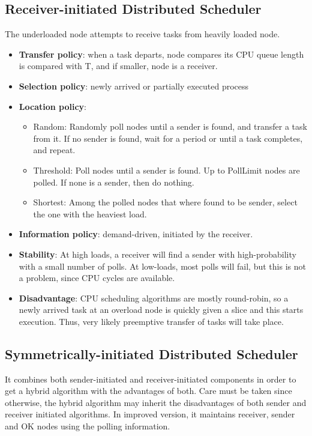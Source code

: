 \documentclass[twoside]{article}
\begin{document}
\subsection{Receiver-initiated Distributed Scheduler }

The underloaded node attempts to receive tasks from heavily loaded node.
\begin{itemize}
\item {\bf Transfer policy}: when a task departs, node compares its CPU queue length is
compared with T, and if smaller, node is a receiver.
\item {\bf Selection policy}:  newly arrived or partially executed
process
\item {\bf Location policy}:
\begin{itemize}
\item Random: Randomly poll nodes until a sender is found, and transfer a
task from it. If no sender is found, wait for a period or until a task completes,
and repeat.
\item Threshold: Poll nodes until a sender is found. Up to PollLimit nodes are polled.
If none is a sender, then do nothing.
\item Shortest: Among the polled nodes that where found to be sender, select the
one with the heaviest load. 
\end{itemize}
\item {\bf Information policy}: demand-driven, initiated by the receiver.
\item{\bf  Stability}: At high loads, a receiver will find a sender with high-probability
with a small number of polls. At low-loads, most polls will fail, but this is
not a problem, since CPU cycles are available.
\item {\bf Disadvantage}: CPU scheduling algorithms are mostly round-robin, so a newly
arrived task at an overload node is quickly given a slice and this starts
execution. Thus, very likely preemptive transfer of tasks will take place. 
\end{itemize}

\subsection{Symmetrically-initiated Distributed Scheduler }
It combines both sender-initiated and receiver-initiated
components in order to get a hybrid algorithm with the
advantages of both. Care must be taken since otherwise, the hybrid algorithm may
inherit the disadvantages of both sender and receiver initiated
algorithms. In improved version, it maintains receiver, sender and OK nodes using the polling information. 
\end{document}
